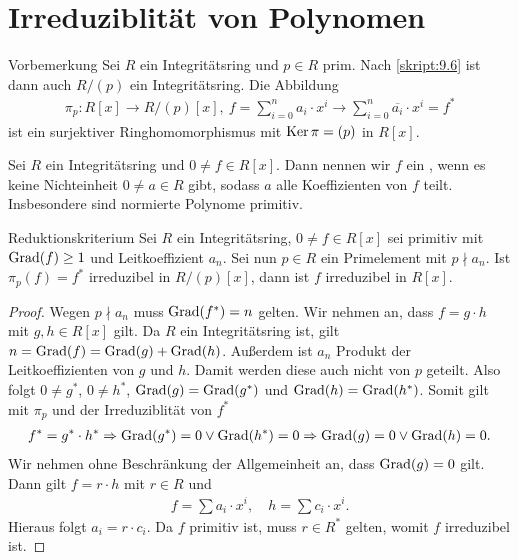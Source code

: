 \section{Irreduziblität von Polynomen}

\begin{genericdf}{Vorbemerkung}\label{skript:10.1}
	Sei $ R $ ein Integritätsring und $ p \in R $ prim.
	Nach \ref{skript:9.6} ist dann auch $ R / (p) $ ein Integritätsring.
	Die Abbildung
	\begin{align*}
	\pi_p : R[x] \to R/(p)[x], \ 
	f = \sum \limits_{i=0}^{n} a_i \cdot x^i \to \sum \limits_{i=0}^{n} \overline{a_i} \cdot x^i = f^\ast
	\end{align*}
	ist ein surjektiver Ringhomomorphismus mit $ \operatorname{Ker} \pi = (p) $ in $ R[x] $.	
\end{genericdf}

\begin{df}\label{skript:10.2}
	Sei $ R $ ein Integritätsring und $ 0 \neq f \in R[x] $.
	Dann nennen wir $ f $ ein ,
	wenn es keine Nichteinheit $ 0 \neq a \in R $ gibt, sodass $ a $ alle Koeffizienten
	von $ f $ teilt.
	Insbesondere sind normierte Polynome primitiv.
\end{df}

\begin{genericthm}{Reduktionskriterium}\label{skript:10.3}
	Sei $ R $ ein Integritätsring,
	$ 0 \neq f \in R[x] $ sei primitiv mit $ \operatorname{Grad}(f) \geq 1 $ und Leitkoeffizient $ a_n  $.
	Sei nun $ p \in R $ ein Primelement mit $ p \nmid a_n $.
	Ist $ \pi_p(f) = f^\ast $ irreduzibel in $ R/(p)[x] $,
	dann ist $ f $ irreduzibel in $ R[x] $.
\end{genericthm}

\begin{proof}
	Wegen $ p \nmid a_n $ muss $ \operatorname{Grad}(f^\ast) = n$ gelten.
	Wir nehmen an, dass $ f = g \cdot h $ mit $ g,h \in R[x] $ gilt.
	Da $ R $ ein Integritätsring ist, gilt $ n = \operatorname{Grad}(f) = \operatorname{Grad}(g) + \operatorname{Grad}(h) $.
	Außerdem ist $ a_n $ Produkt der Leitkoeffizienten von $ g $ und $ h $.
	Damit werden diese auch nicht von $ p $ geteilt.
	Also folgt $ 0 \neq g^\ast $, $ 0 \neq h^\ast $, $ \operatorname{Grad}(g) = \operatorname{Grad}(g^\ast) $
	und $ \operatorname{Grad}(h)  = \operatorname{Grad}(h^\ast)$.
	Somit gilt mit $ \pi_p $ und der Irreduziblität von $ f^\ast $
	\begin{align*}
	f^\ast = g^\ast \cdot h^\ast
	\Rightarrow
	\operatorname{Grad}(g^\ast) = 0 \vee \operatorname{Grad}(h^\ast ) = 0
	\Rightarrow
	\operatorname{Grad}(g) = 0 \vee \operatorname{Grad}(h) = 0.
	\end{align*}
	Wir nehmen ohne Beschränkung der Allgemeinheit an, dass $ \operatorname{Grad}(g) = 0  $ gilt.
	Dann gilt $ f = r \cdot h  $ mit $ r \in R $ und 
	\begin{align*}
	f = \sum a_i \cdot x^i, \quad h = \sum c_i \cdot x^i.
	\end{align*}
	Hieraus folgt $ a_i = r \cdot c_i $.
	Da $ f $ primitiv ist, muss $ r \in R^\ast  $ gelten, womit $ f $ irreduzibel ist.
\end{proof}

